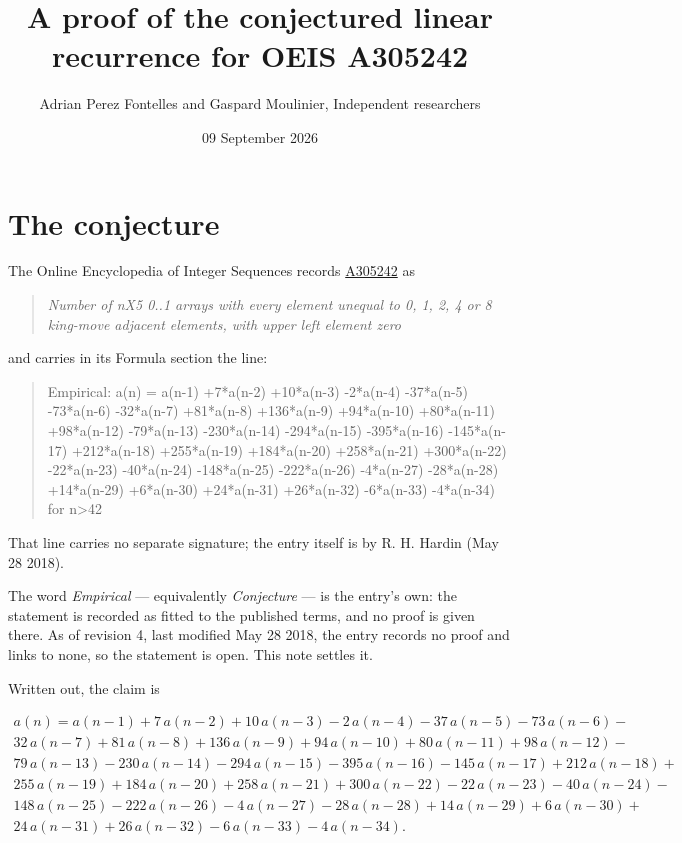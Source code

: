 \documentclass[11pt]{article}
\title{A proof of the conjectured linear recurrence for OEIS A305242}
\author{Adrian Perez Fontelles and Gaspard Moulinier, Independent researchers}
\date{09 September 2026}
\theoremstyle{definition}
\begin{document}
\maketitle
\section{The conjecture}

The Online Encyclopedia of Integer Sequences records \href{https://oeis.org/A305242}{A305242} as

\begin{quote}\itshape Number of nX5 0..1 arrays with every element unequal to 0, 1, 2, 4 or 8 king-move adjacent elements, with upper left element zero\end{quote}

and carries in its Formula section the line:

\begin{quote}\ttfamily Empirical: a(n) = a(n-1) +7*a(n-2) +10*a(n-3) -2*a(n-4) -37*a(n-5) -73*a(n-6) -32*a(n-7) +81*a(n-8) +136*a(n-9) +94*a(n-10) +80*a(n-11) +98*a(n-12) -79*a(n-13) -230*a(n-14) -294*a(n-15) -395*a(n-16) -145*a(n-17) +212*a(n-18) +255*a(n-19) +184*a(n-20) +258*a(n-21) +300*a(n-22) -22*a(n-23) -40*a(n-24) -148*a(n-25) -222*a(n-26) -4*a(n-27) -28*a(n-28) +14*a(n-29) +6*a(n-30) +24*a(n-31) +26*a(n-32) -6*a(n-33) -4*a(n-34) for n>42\end{quote}

That line carries no separate signature; the entry itself is by R. H. Hardin (May 28 2018).

The word {\itshape Empirical} --- equivalently {\itshape Conjecture} --- is the entry's own: the statement is recorded as fitted to the published terms, and no proof is given there. As of revision 4, last modified May 28 2018, the entry records no proof and links to none, so the statement is open. This note settles it.

Written out, the claim is

\begin{multline*} a(n) = a(n-1) + 7\,a(n-2) + 10\,a(n-3) - 2\,a(n-4) - 37\,a(n-5) - 73\,a(n-6) - \\ 32\,a(n-7) + 81\,a(n-8) + 136\,a(n-9) + 94\,a(n-10) + 80\,a(n-11) + 98\,a(n-12) - \\ 79\,a(n-13) - 230\,a(n-14) - 294\,a(n-15) - 395\,a(n-16) - 145\,a(n-17) + 212\,a(n-18) + \\ 255\,a(n-19) + 184\,a(n-20) + 258\,a(n-21) + 300\,a(n-22) - 22\,a(n-23) - 40\,a(n-24) - \\ 148\,a(n-25) - 222\,a(n-26) - 4\,a(n-27) - 28\,a(n-28) + 14\,a(n-29) + 6\,a(n-30) + \\ 24\,a(n-31) + 26\,a(n-32) - 6\,a(n-33) - 4\,a(n-34). \end{multline*}
\end{document}
